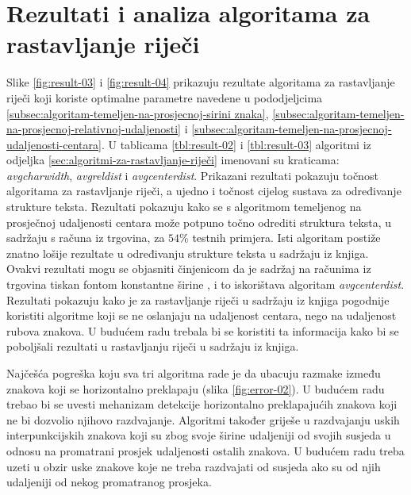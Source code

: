 \documentclass[times, utf8, zavrsni]{fer}
\begin{document}
\section{Rezultati i analiza algoritama za rastavljanje riječi}
Slike \ref{fig:result-03} i \ref{fig:result-04} prikazuju rezultate algoritama za rastavljanje riječi koji koriste optimalne parametre navedene u pododjeljcima \ref{subsec:algoritam-temeljen-na-prosjecnoj-sirini znaka},
\ref{subsec:algoritam-temeljen-na-prosjecnoj-relativnoj-udaljenosti} i
\ref{subsec:algoritam-temeljen-na-prosjecnoj-udaljenosti-centara}. U tablicama \ref{tbl:result-02} i \ref{tbl:result-03} algoritmi iz odjeljka \ref{sec:algoritmi-za-rastavljanje-riječi} imenovani su kraticama: \emph{avgcharwidth}, \emph{avgreldist} i \emph{avgcenterdist}. Prikazani rezultati pokazuju točnost algoritama za rastavljanje riječi, a ujedno i točnost cijelog sustava za određivanje strukture teksta.
Rezultati pokazuju kako se s algoritmom temeljenog na prosječnoj udaljenosti centara može potpuno točno odrediti struktura teksta, u sadržaju s računa iz trgovina, za $54\%$ testnih primjera. Isti algoritam postiže znatno lošije rezultate u određivanju strukture teksta u sadržaju iz knjiga. Ovakvi rezultati mogu se objasniti činjenicom da je sadržaj na računima iz trgovina tiskan fontom konstantne širine , i to iskorištava algoritam \emph{avgcenterdist}. Rezultati pokazuju kako je za rastavljanje riječi u sadržaju iz knjiga pogodnije koristiti algoritme koji se ne oslanjaju na udaljenost centara, nego na udaljenost rubova znakova. U budućem radu trebala bi se koristiti ta informacija kako bi se poboljšali rezultati u rastavljanju riječi u sadržaju iz knjiga.

Najčešća pogreška koju sva tri algoritma rade je da ubacuju razmake između znakova koji se horizontalno preklapaju (slika \ref{fig:error-02}). U budućem radu trebao bi se uvesti mehanizam detekcije horizontalno preklapajućih znakova koji ne bi dozvolio njihovo razdvajanje. Algoritmi također griješe u razdvajanju uskih interpunkcijskih znakova koji su zbog svoje širine udaljeniji od svojih susjeda u odnosu na promatrani prosjek udaljenosti ostalih znakova. U budućem radu treba uzeti u obzir uske znakove koje ne treba razdvajati od susjeda ako su od njih udaljeniji od nekog promatranog prosjeka.
\end{document}
